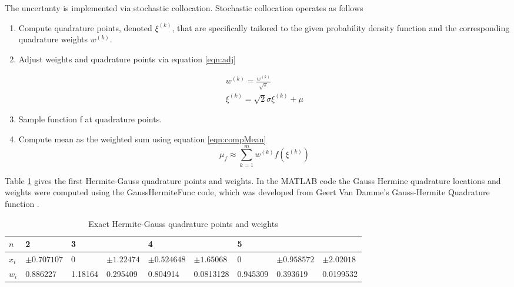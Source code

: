 \documentclass[12pt]{article}
\begin{document}
	The uncertanty is implemented via stochastic collocation. Stochastic collocation operates as follows
	\begin{enumerate}
		\item Compute quadrature points, denoted $\xi^{(k)}$, that are specifically tailored to the given probability density function and the corresponding
		quadrature weights $w^{(k)}$.
		\item Adjust weights and quadrature points via equation \ref{eqn:adj} \cite{Hicken18}
		
		\begin{equation}
		\begin{array} { l } { w ^ { ( k ) } = \frac { w ^ { ( k ) } } { \sqrt { \pi } } } \\ { \xi ^ { ( k ) } =\sqrt { 2 } \sigma \xi ^ { ( k ) } + \mu } \end{array}
		\label{eqn:adj}
		\end{equation}
		\item Sample function f at quadrature points.
		\item Compute mean as the weighted sum using equation \ref{eqn:compMean} \cite{Hicken18}
		\begin{equation}
		\mu _ { f } \approx \sum _ { k = 1 } ^ { m } w ^ { ( k ) } f \left( \xi ^ { ( k ) } \right)
		\label{eqn:compMean}
		\end{equation}
	\end{enumerate}
	
	Table \ref{tab:exactGH} gives the first Hermite-Gauss quadrature points and weights. In the MATLAB code the Gauss Hermine quadrature locations and weights were computed using the GaussHermiteFunc code, which was developed from Geert Van Damme's Gauss-Hermite Quadrature function \cite{ghMATLABcode}.
	\begin{table}[H]\fontsize{10}{14}\selectfont
		\caption{Exact Hermite-Gauss quadrature points and weights \cite{mathTabBK}}
		\label{tab:exactGH}
		\begin{tabular}{|l|l|l|l|l|l|l|l|l|}
			\hline
			$n$ & 2 & 3 &  & 4 &  & 5 &  &  \\ \hline
			$x_i$ & $\pm0.707107$ & 0 & $\pm1.22474$ & $\pm0.524648$ & $\pm1.65068$ & 0 & $\pm0.958572$ & $\pm2.02018$ \\ \hline
			$w_i$ & 0.886227 & 1.18164 & 0.295409 & 0.804914 & 0.0813128 & 0.945309 & 0.393619 & 0.0199532 \\ \hline
		\end{tabular}
	\centering
	\end{table}\fontsize{12}{12}\selectfont
\end{document}
